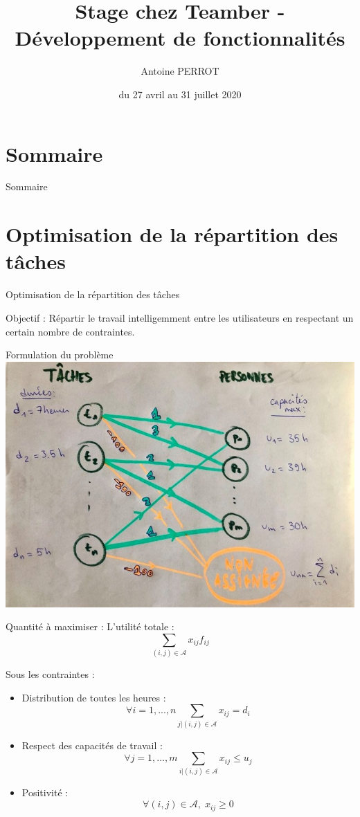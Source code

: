 \documentclass[french]{beamer}
\title{Stage chez Teamber - Développement de fonctionnalités}
\author[Antoine Perrot]{Antoine PERROT}
\date{du 27 avril au 31 juillet 2020}
\institute[UT3 -- FSI]{Université Toulouse~3 -- Faculté des sciences et ingénierie}
\begin{document}
\begin{frame}
	\titlepage
\end{frame}


\section*{Sommaire}
\begin{frame}{Sommaire}
	\tableofcontents
\end{frame}


\section{Optimisation de la répartition des tâches}
\begin{frame}{Optimisation de la répartition des tâches}
\begin{block}{Objectif :}
Répartir le travail intelligemment entre les utilisateurs en respectant un certain nombre de contraintes.
\end{block}
\end{frame}

\begin{frame}{Formulation du problème}
\includegraphics[width=0.9\textwidth>]{graphe}
\end{frame}

\begin{frame}
\begin{block}{Quantité à maximiser :}
L'utilité totale :
\[
\sum_{(i,j) \in \mathcal{A}} x_{ij}f_{ij} 
\]

\end{block}
\begin{block}{Sous les contraintes :}
\begin{itemize}
\item Distribution de toutes les heures :
\[
\forall i = 1,...,n  \sum_{j| (i,j) \in \mathcal{A}} x_{ij} = d_i
\]
\item Respect des capacités de travail :
\[
\forall j = 1,...,m  \sum_{i| (i,j) \in \mathcal{A}} x_{ij} \leq u_j
\]
\item Positivité :
\[
\forall (i,j) \in \mathcal{A},\; x_{ij} \geq 0
\]
\end{itemize}
\end{block}
\end{frame}
\end{document}
